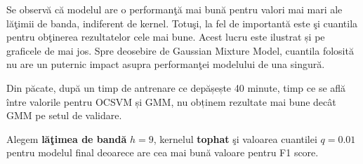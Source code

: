 Se observă că modelul are o performanţă mai bună pentru valori 
mai mari ale lăţimii de banda, indiferent de kernel. Totuşi, 
la fel de importantă este şi cuantila pentru obţinerea rezultatelor 
cele mai bune. Acest lucru este ilustrat și pe graficele de mai jos. 
Spre deosebire de Gaussian Mixture Model, cuantila 
folosită nu are un puternic impact asupra performanţei modelului de una singură.

Din păcate, după un timp de antrenare ce depășește 40 minute, 
timp ce se află între valorile pentru OCSVM și GMM, nu obținem 
rezultate mai bune decât GMM
pe setul de validare. 

Alegem \textbf{lăţimea de bandă} $h=9$, kernelul \textbf{tophat} şi valoarea
cuantilei $q=0.01$ pentru modelul final deoarece are cea
mai bună valoare pentru F1 score.

